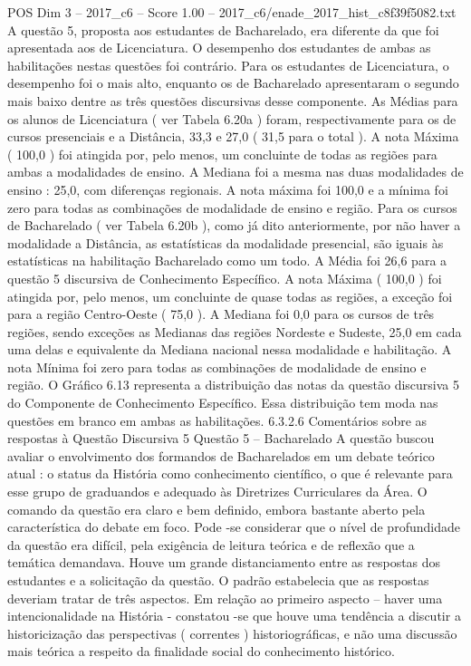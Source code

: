 \begin{textsample}{POS Dim 3 – 2017\_c6 – Score 1.00 – 2017\_c6/enade\_2017\_hist\_c8f39f5082.txt}
A questão 5, proposta aos estudantes de Bacharelado, era diferente da que foi apresentada aos de Licenciatura.
O desempenho dos estudantes de ambas as habilitações nestas questões foi contrário.
Para os estudantes de Licenciatura, o desempenho foi o mais alto, enquanto os de Bacharelado apresentaram o segundo mais baixo dentre as três questões discursivas desse componente.
As Médias para os alunos de Licenciatura ( ver Tabela 6.20a ) foram, respectivamente para os de cursos presenciais e a Distância, 33,3 e 27,0 ( 31,5 para o total ).
A nota Máxima ( 100,0 ) foi atingida por, pelo menos, um concluinte de todas as regiões para ambas a modalidades de ensino.
A Mediana foi a mesma nas duas modalidades de ensino : 25,0, com diferenças regionais.
A nota máxima foi 100,0 e a mínima foi zero para todas as combinações de modalidade de ensino e região.
Para os cursos de Bacharelado ( ver Tabela 6.20b ), como já dito anteriormente, por não haver a modalidade a Distância, as estatísticas da modalidade presencial, são iguais às estatísticas na habilitação Bacharelado como um todo.
A Média foi 26,6 para a questão 5 discursiva de Conhecimento Específico.
A nota Máxima ( 100,0 ) foi atingida por, pelo menos, um concluinte de quase todas as regiões, a exceção foi para a região Centro-Oeste ( 75,0 ).
A Mediana foi 0,0 para os cursos de três regiões, sendo exceções as Medianas das regiões Nordeste e Sudeste, 25,0 em cada uma delas e equivalente da Mediana nacional nessa modalidade e habilitação.
A nota Mínima foi zero para todas as combinações de modalidade de ensino e região.
O Gráfico 6.13 representa a distribuição das notas da questão discursiva 5 do Componente de Conhecimento Específico.
Essa distribuição tem moda nas questões em branco em ambas as habilitações. 6.3.2.6 Comentários sobre as respostas à Questão Discursiva 5 Questão 5 – Bacharelado A questão buscou avaliar o envolvimento dos formandos de Bacharelados em um debate teórico atual : o status da História como conhecimento científico, o que é relevante para esse grupo de graduandos e adequado às Diretrizes Curriculares da Área.
O comando da questão era claro e bem definido, embora bastante aberto pela característica do debate em foco.
Pode -se considerar que o nível de profundidade da questão era difícil, pela exigência de leitura teórica e de reflexão que a temática demandava.
Houve um grande distanciamento entre as respostas dos estudantes e a solicitação da questão.
O padrão estabelecia que as respostas deveriam tratar de três aspectos.
Em relação ao primeiro aspecto – haver uma intencionalidade na História - constatou -se que houve uma tendência a discutir a historicização das perspectivas ( correntes ) historiográficas, e não uma discussão mais teórica a respeito da finalidade social do conhecimento histórico.

\end{textsample}

